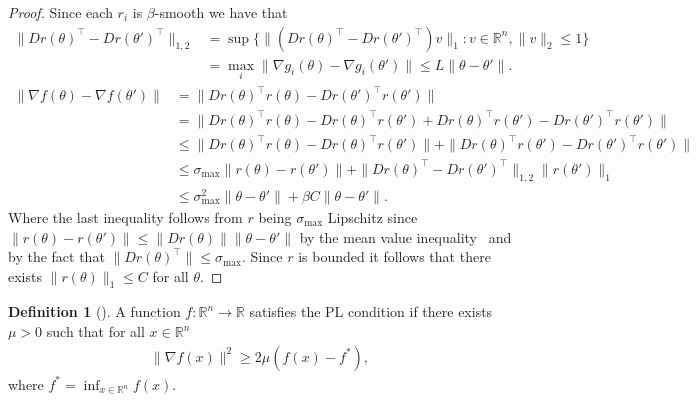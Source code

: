 \documentclass{article} %
\theoremstyle{definition}
\newtheorem{definition}[theorem]{Definition}
\newcommand{\reals}{\mathbb{R}}
\begin{document}
\begin{proof}
Since each $r_i$ is $\beta$-smooth we have that
    \begin{align*}
    \|Dr(\theta)^\top-Dr(\theta')^\top\|_{1,2} &= \sup\{\|(Dr(\theta)^\top-Dr(\theta')^\top)v\|_{1}: v \in \reals^n , \|v\|_2\leq 1\} \\ 
    &=\max_{i}\|\nabla g_i(\theta)-\nabla g_i(\theta')\| \leq L\|\theta-\theta'\|.    
    \end{align*}
    \begin{align*}
        \|\nabla f(\theta)-\nabla f(\theta')\| &= \|Dr(\theta)^\top r(\theta) - Dr(\theta')^\top r(\theta')\| \\
        &= \|Dr(\theta)^\top r(\theta) -Dr(\theta)^\top r(\theta')+ Dr(\theta)^\top r(\theta') - Dr(\theta')^\top r(\theta')\|\\
        &\leq \|Dr(\theta)^\top r(\theta) -Dr(\theta)^\top r(\theta')\| + \|Dr(\theta)^\top r(\theta') - Dr(\theta')^\top r(\theta')\|\\
        &\leq \sigma_{\max}\|r(\theta)-r(\theta')\| + \|Dr(\theta)^\top - Dr(\theta')^\top\|_{1,2}\|r(\theta')\|_1\\
        &\leq \sigma_{\max}^2\|\theta - \theta'\|+\beta C\|\theta-\theta'\|.
    \end{align*}
    Where the last inequality follows from $r$ being $\sigma_{\max}$ Lipschitz since $\|r(\theta) - r(\theta')\| \leq \|Dr(\theta)\|\|\theta-\theta'\|$ by the mean value inequality~\citep{hormander2007analysis} and by the fact that $\|Dr(\theta)^\top\| \leq \sigma_{\max}$.
    Since $r$ is bounded it follows that there exists $\|r(\theta)\|_1 \leq C$ for all $\theta$.
\end{proof}

\begin{definition}[\cite{polyak1964gradient,lojasiewicz1963propriete}]\label{def:pl}
A function $f: \reals^n \to \reals$ 
satisfies the PL condition if there exists $\mu > 0$
such that for all $x \in \reals^n$
\begin{align}
   \|\nabla f(x)\|^2 \geq 2 \mu (f(x) -f^\ast),
\end{align}
where $f^\ast = \inf_{x \in \reals^n}f(x)$. 
\end{definition}
\end{document}
